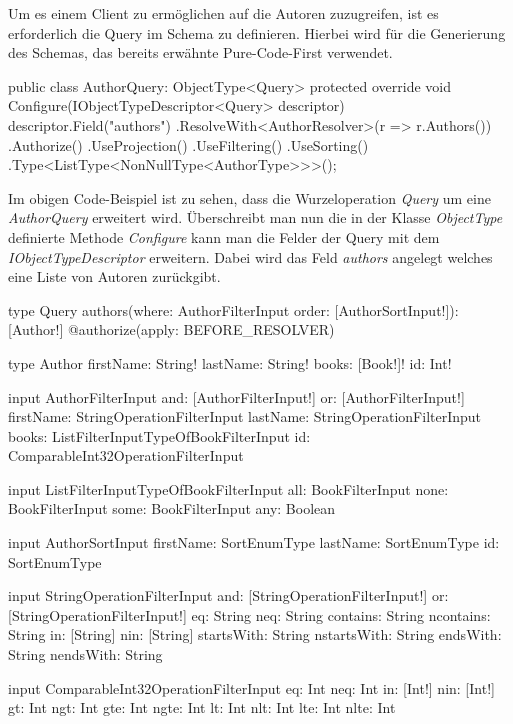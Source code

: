 Um es einem Client zu ermöglichen auf die Autoren zuzugreifen, ist es erforderlich die Query im Schema zu definieren.
Hierbei wird für die Generierung des Schemas, das bereits erwähnte Pure-Code-First verwendet.
\newline

\begin{JsCode}
public class AuthorQuery: ObjectType<Query> {
    protected override void Configure(IObjectTypeDescriptor<Query> descriptor) {
        descriptor.Field("authors")
            .ResolveWith<AuthorResolver>(r => r.Authors())
            .Authorize()
            .UseProjection()
            .UseFiltering()
            .UseSorting()
            .Type<ListType<NonNullType<AuthorType>>>();
    }
}
\end{JsCode}

Im obigen Code-Beispiel ist zu sehen, dass die Wurzeloperation \textit{Query} um eine \textit{AuthorQuery} erweitert wird.
Überschreibt man nun die in der Klasse \textit{ObjectType} definierte Methode \textit{Configure} kann man die Felder der Query mit dem \textit{IObjectTypeDescriptor} erweitern.
Dabei wird das Feld \textit{authors} angelegt welches eine Liste von Autoren zurückgibt.

\begin{JsCode}
type Query{
    authors(where: AuthorFilterInput order: [AuthorSortInput!]): [Author!] @authorize(apply: BEFORE_RESOLVER)
}

type Author {
    firstName: String!
    lastName: String!
    books: [Book!]!
    id: Int!
}

input AuthorFilterInput {
    and: [AuthorFilterInput!]
    or: [AuthorFilterInput!]
    firstName: StringOperationFilterInput
    lastName: StringOperationFilterInput
    books: ListFilterInputTypeOfBookFilterInput
    id: ComparableInt32OperationFilterInput
}

input ListFilterInputTypeOfBookFilterInput {
  all: BookFilterInput
  none: BookFilterInput
  some: BookFilterInput
  any: Boolean
}

input AuthorSortInput {
    firstName: SortEnumType
    lastName: SortEnumType
    id: SortEnumType
}

input StringOperationFilterInput {
  and: [StringOperationFilterInput!]
  or: [StringOperationFilterInput!]
  eq: String
  neq: String
  contains: String
  ncontains: String
  in: [String]
  nin: [String]
  startsWith: String
  nstartsWith: String
  endsWith: String
  nendsWith: String
}

input ComparableInt32OperationFilterInput {
    eq: Int
    neq: Int
    in: [Int!]
    nin: [Int!]
    gt: Int
    ngt: Int
    gte: Int
    ngte: Int
    lt: Int
    nlt: Int
    lte: Int
    nlte: Int
}
\end{JsCode}

